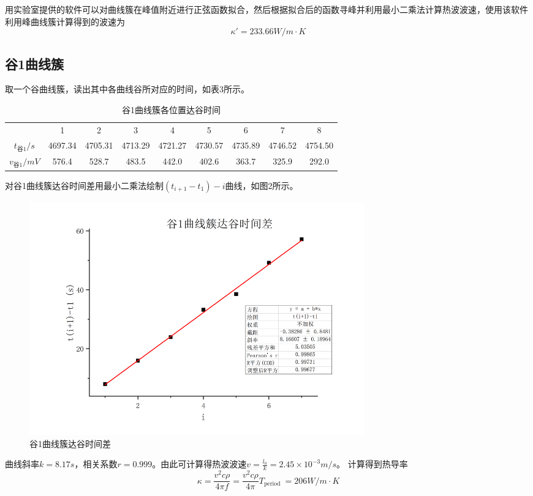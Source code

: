 \documentclass{article}
\begin{document}
    用实验室提供的软件可以对曲线簇在峰值附近进行正弦函数拟合，然后根据拟合后的函数寻峰并利用最小二乘法计算热波波速，使用该软件利用峰曲线簇计算得到的波速为
    $$\kappa'=233.66W/m\cdot K$$

    \subsection{谷1曲线簇}
    取一个谷曲线簇，读出其中各曲线谷所对应的时间，如表3所示。

    \begin{table}[h]
        \centering
        \caption{谷1曲线簇各位置达谷时间}
        \vspace{1ex}
        \begin{tabular}{ccccccccc}
            \hline
                  & 1     & 2     & 3     & 4     & 5     & 6     & 7     & 8 \bigstrut[t]\\
            $t_{\text{谷}1}/s$ & 4697.34  & 4705.31  & 4713.29  & 4721.27  & 4730.57  & 4735.89  & 4746.52  & 4754.50  \\
            $v_{\text{谷}1}/mV$ & 576.4  & 528.7  & 483.5  & 442.0  & 402.6  & 363.7  & 325.9  & 292.0  \bigstrut[b]\\
            \hline
        \end{tabular}%
    \end{table}

    对谷1曲线簇达谷时间差用最小二乘法绘制$\left(t_{i+1}-t_{1} \right)-i$曲线，如图2所示。
    
    \begin{figure}[h]
        \centering
        \includegraphics[width=0.7\textwidth]{谷1.jpg}
        \caption{谷1曲线簇达谷时间差}
    \end{figure}

    曲线斜率$k=8.17s$，相关系数$r=0.999$。由此可计算得热波波速$v=\frac{l_0}{k}=2.45\times 10^{-3}m/s$。
    计算得到热导率
    $$\kappa=\frac{v^{2} c \rho}{4 \pi f}=\frac{v^{2} c \rho}{4 \pi} T_{\text {period }}=206W/m\cdot K$$
\end{document}
